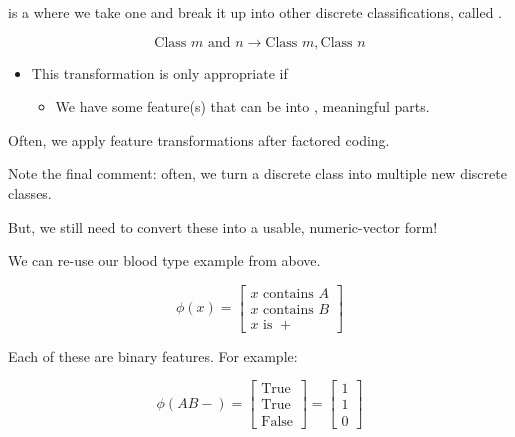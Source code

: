                 \begin{definition}
                     is a  where we take one  and break it up into other discrete classifications, called .

                    \begin{equation*}
                        \text{Class } m \text{ and } n \longrightarrow \text{Class } m, \text{Class } n
                    \end{equation*}

                    \begin{itemize}
                        \item This transformation is only appropriate if
                            \begin{itemize}
                                \item We have some feature(s) that can be  into , meaningful parts.
                            \end{itemize}
                    \end{itemize}

                    Often, we apply  feature transformations after factored coding. 
                \end{definition}

                Note the final comment: often, we turn a discrete class into multiple new discrete classes. 

                But, we still need to convert these into a usable, numeric-vector form!

                \miniex We can re-use our blood type example from above.

                \begin{equation}
                    \phi(x) = 
                    \begin{bmatrix}
                        x \text{ contains } A \\
                        x \text{ contains } B \\
                        x \text{ is } +
                    \end{bmatrix}
                \end{equation}

                Each of these are binary features. For example:

                \begin{equation}
                    \phi(AB-) =
                    \begin{bmatrix}
                        \text{True} \\
                        \text{True} \\
                        \text{False}
                    \end{bmatrix}
                    =
                    \begin{bmatrix}
                        1 \\ 1 \\ 0
                    \end{bmatrix}
                \end{equation}

